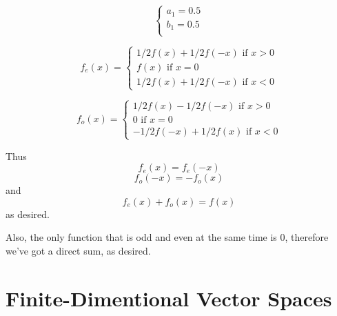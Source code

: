 \documentclass[10pt,oneside,titlepage]{book}
\begin{document}
$$
\begin{cases}
  a_1  = 0.5 \\
  b_1 = 0.5 \\
\end{cases}
$$

$$
f_e(x) =
\begin{cases}
  1/2 f(x) + 1/2 f(-x) \text{ if } x > 0 \\
  f(x) \text{ if } x = 0 \\
  1/2 f(x) + 1/2 f(-x)  \text{ if } x < 0
\end{cases}
$$

$$
f_o(x) =
\begin{cases}
  1/2 f(x) - 1/2 f(-x) \text{ if } x > 0 \\
  0 \text{ if } x = 0 \\
  -1/2 f(-x) + 1/2 f(x)  \text{ if } x < 0
\end{cases}
$$

Thus
$$f_e(x) = f_e(-x)$$
$$f_o(-x) = -f_o(x)$$
and
$$f_e(x) + f_o(x) = f(x)$$
as desired.

Also, the only function that is odd and even at the same time is $0$,
therefore we've got a direct sum, as desired.


\chapter{Finite-Dimentional Vector Spaces}
\end{document}
